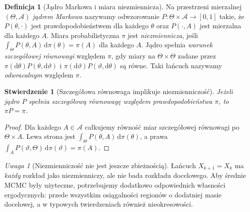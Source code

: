 \documentclass[11pt,a4paper,oneside]{report}
\numberwithin{equation}{chapter}
\theoremstyle{plain}
\newtheorem{stwierdzenie}[twierdzenie]{Stwierdzenie}
\theoremstyle{definition}
\newtheorem{definicja}{Definicja}[chapter]
\theoremstyle{remark}
\newtheorem{uwaga}{Uwaga}[chapter]
\newcommand{\dd}{\mathrm d}
\begin{document}
\begin{definicja}[Jądro Markowa i miara niezmiennicza]
\label{def:mcmc-kernel}
Na przestrzeni mierzalnej $(\Theta,\mathcal A)$ \emph{jądrem Markowa}
nazywamy odwzorowanie $P\colon\Theta\times\mathcal A\to[0,1]$
takie, że $P(\theta,\cdot)$ jest prawdopodobieństwem dla
każdego $\theta$ oraz $P(\cdot,A)$ jest mierzalna dla każdego $A$.
Miara probabilistyczna $\pi$ jest \emph{niezmiennicza}, jeśli
$\int_\Theta P(\theta,A)\,\dd\pi(\theta)=\pi(A)$ dla każdego $A$.
Jądro spełnia \emph{warunek szczegółowej równowagi} względem $\pi$,
gdy miary na $\Theta\times\Theta$ zadane przez
$\pi(\dd\theta)P(\theta,\dd\vartheta)$ i
$\pi(\dd\vartheta)P(\vartheta,\dd\theta)$ są równe.
Taki łańcuch nazywamy \emph{odwracalnym} względem $\pi$.
\end{definicja}

\begin{stwierdzenie}[Szczegółowa równowaga implikuje niezmienniczość]
\label{prop:balance-invariant}
Jeżeli jądro $P$ spełnia szczegółową równowagę względem
prawdopodobieństwa $\pi$, to $\pi P=\pi$.
\end{stwierdzenie}
\begin{proof}
Dla każdego $A\in\mathcal A$ całkujemy równość miar
szczegółowej równowagi po $\Theta\times A$.
Lewa strona jest $\int_\Theta P(\theta,A)\,\dd\pi(\theta)$,
a prawa $\int_A P(\vartheta,\Theta)\,\dd\pi(\vartheta)=\pi(A)$.
\end{proof}

\begin{uwaga}[Niezmienniczość nie jest jeszcze zbieżnością]
Łańcuch $X_{k+1}=X_k$ ma \emph{każdy} rozkład jako
niezmienniczy, ale nie bada rozkładu docelowego.
Aby średnie MCMC były użyteczne, potrzebujemy dodatkowo
odpowiednich własności ergodycznych: przede wszystkim
osiągalności regionów o dodatniej masie docelowej,
a w typowych twierdzeniach również nieokresowości.
\end{uwaga}
\end{document}
